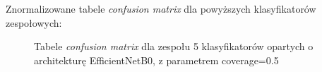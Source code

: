 \documentclass[polish,12pt]{aghthesis}
\begin{document}
\newpage
\noindent Znormalizowane tabele \textit{confusion matrix} dla powyższych klasyfikatorów zespołowych:
\begin{figure}[h!]%
    \begin{adjustbox}{minipage=1.0\paperwidth, pagecenter}
    \centering
    \qquad
    \end{adjustbox}
    \label{fig:eff-ens-5-0.5-matrices}
    \caption{Tabele \textit{confusion matrix} dla zespołu 5 klasyfikatorów opartych o architekturę EfficientNetB0, z parametrem coverage=0.5}
\end{figure}
\end{document}
